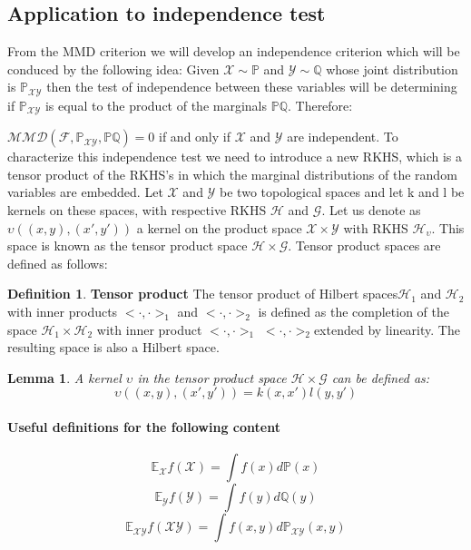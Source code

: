 \documentclass[8pt,a4paper]{article}
\theoremstyle{plain}
\newtheorem{lem}[thm]{Lemma}
\theoremstyle{definition}
\newtheorem{defn}{Definition}[section]
\theoremstyle{remark}
\begin{document}
\subsection{Application to independence test}

From the MMD criterion we will develop an independence criterion which will be conduced by the following idea:
Given $\mathcal{X} \sim \mathbb{P}$ and $\mathcal{Y} \sim \mathbb{Q}$ whose joint distribution is $\mathbb{P}_{\mathcal{XY}}$ then the test of independence between these variables will be determining if $\mathbb{P}_{\mathcal{XY}}$ is equal to the product of the marginals $\mathbb{P}\mathbb{Q}$. Therefore:

$\mathcal{MMD}(\mathcal{F}, \mathbb{P}_{\mathcal{XY}},\mathbb{P}\mathbb{Q}) = 0$ if and only if $\mathcal{X}$ and $\mathcal{Y}$ are independent.
To characterize this independence test we need to introduce a new RKHS, which is a tensor product of the RKHS’s in which the marginal distributions of the random variables are embedded. Let $\mathcal{X}$ and $\mathcal{Y}$ be two topological spaces and let k and l be kernels on these spaces, with respective RKHS $\mathcal{H}$ and $\mathcal{G}$. Let us denote as $\upsilon((x, y), (x' , y ' ))$ a kernel on the product space $\mathcal{X}\times\mathcal{Y}$ with RKHS $\mathcal{H}_{\upsilon}$. This space is known as the tensor product space $\mathcal{H}\times\mathcal{G}$. Tensor product spaces are defined as follows:
\begin{defn}
\textbf{Tensor product}
The tensor product of Hilbert spaces$\mathcal{H}_{1}$ and $\mathcal{H}_{2}$  with inner products $<·, ·>_{1}$ and
$<·, ·>_{2}$ is defined as the completion of the space $\mathcal{H}_{1}\times\mathcal{H}_{2}$  with inner product  $<·, ·>_{1}$ $<·, ·>_{2}$extended
by linearity. The resulting space is also a Hilbert space.
\end{defn}
\begin{lem}
A kernel $\upsilon$ in the tensor product space  $\mathcal{H}\times\mathcal{G}$ can be defined as:
$$\upsilon((x,y),(x',y')) = k(x,x')l(y,y')$$
\end{lem}
\paragraph{Useful definitions for the following content}
$$\mathbb{E}_{\mathcal{X}}f(\mathcal{X}) = \int f(x)d\mathbb{P}(x)$$
$$\mathbb{E}_{\mathcal{Y}}f(\mathcal{Y}) = \int f(y)d\mathbb{Q}(y)$$
$$\mathbb{E}_{\mathcal{X}\mathcal{Y}}f(\mathcal{X}\mathcal{Y}) = \int f(x,y)d\mathbb{P}_{\mathcal{X}\mathcal{Y}}(x,y)$$
\end{document}

